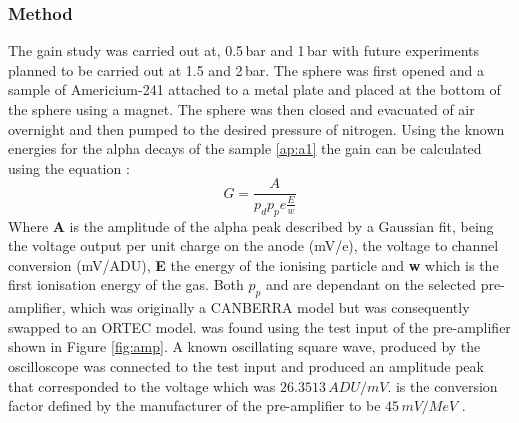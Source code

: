 \documentclass[a4paper]{article}
\begin{document}
\subsubsection{Method}
The gain study was carried out at, 0.5\,bar and 1\,bar with future experiments planned to be carried out at 1.5 and 2\,bar. The sphere was first opened and a sample of Americium-241 attached to a metal plate and placed at the bottom of the sphere using a magnet. The sphere was then closed and evacuated of air overnight and then pumped to the desired pressure of nitrogen. Using the known energies for the alpha decays of the sample \ref{ap:a1} the gain can be calculated using the equation \cite{Patrick}:
\begin{equation}
    G = \frac{A}{p_dp_pe\frac{E}{w}}
    \label{eq:gain}
\end{equation}
Where \textbf{A} is the amplitude of the alpha peak described by a Gaussian fit,  being the voltage output per unit charge on the anode (mV/e),   the voltage to channel conversion (mV/ADU), \textbf{E} the energy of the ionising particle and \textbf{w} which is the first ionisation energy of the gas.
\newline Both {$p_p$} and  are dependant on the selected pre-amplifier, which was originally a CANBERRA model but was consequently swapped to an ORTEC model.
\newline {} was found using the test input of the pre-amplifier shown in Figure \ref{fig:amp}. A known oscillating square wave, produced by the oscilloscope was connected to the test input and produced an amplitude peak that corresponded to the voltage which was $26.3513\,ADU/mV$. 
\newline {} is the conversion factor defined by the manufacturer of the pre-amplifier to be $45\,mV/MeV$ \cite{ortec}.
\end{document}
